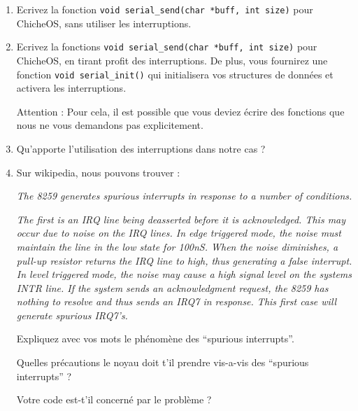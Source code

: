 \begin{enumerate}
\item Ecrivez la fonction \verb+void serial_send(char *buff, int size)+
  pour ChicheOS, sans utiliser les interruptions.
\item Ecrivez la fonctions \verb+void serial_send(char *buff, int size)+
  pour ChicheOS, en tirant profit des interruptions. De plus,
  vous fournirez une fonction \verb+void serial_init()+
  qui initialisera vos structures de donn\'ees et activera les interruptions.

  Attention : Pour cela, il est possible que vous deviez \'ecrire des fonctions que nous
  ne vous demandons pas explicitement.

\item Qu'apporte l'utilisation des interruptions dans notre cas ? 

\item Sur wikipedia, nous pouvons trouver :

\textit{The 8259 generates spurious interrupts in response to a number of conditions.}

\textit{The first is an IRQ line being deasserted before it is acknowledged. This may occur due to noise on the IRQ lines. In edge triggered mode, the noise must maintain the line in the low state for 100nS. When the noise diminishes, a pull-up resistor returns the IRQ line to high, thus generating a false interrupt. In level triggered mode, the noise may cause a high signal level on the systems INTR line. If the system sends an acknowledgment request, the 8259 has nothing to resolve and thus sends an IRQ7 in response. This first case will generate spurious IRQ7's.}

Expliquez avec vos mots le ph\'enom\`ene des ``spurious interrupts''.

Quelles pr\'ecautions le noyau doit t'il prendre vis-a-vis des ``spurious interrupts'' ?

Votre code est-t'il concern\'e par le probl\`eme ?

\end{enumerate}

